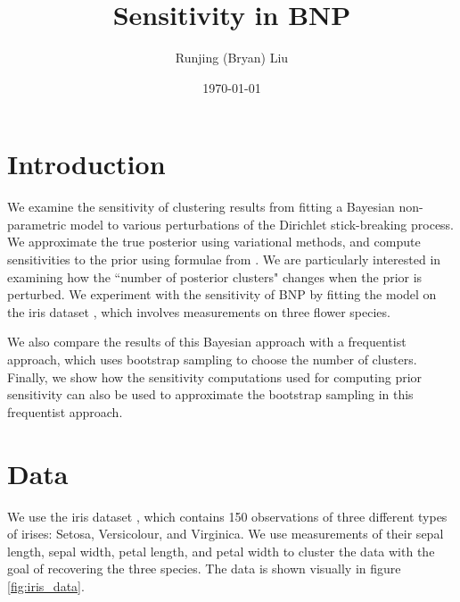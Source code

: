 \documentclass[a4paper]{article}
\title{Sensitivity in BNP}
\author{Runjing (Bryan) Liu}
\date{\today}
\begin{document}
\maketitle
\tableofcontents
\newpage
\section{Introduction}

We examine the sensitivity of clustering results from fitting a
Bayesian non-parametric model to various perturbations of
the Dirichlet stick-breaking process.
We approximate the true posterior using variational methods, and compute
sensitivities to the prior using formulae from \cite{giordano_2017}.
We are particularly interested in examining how the ``number of posterior
clusters" changes when the prior is perturbed. We experiment with the sensitivity
of BNP by fitting the model on the iris dataset
\cite{iris_dataset}, which
involves measurements on three flower species.

We also compare the results of this Bayesian approach with a frequentist approach,
which uses bootstrap sampling to choose the number of clusters. Finally, we
show how the sensitivity computations used for computing prior sensitivity can
also be used to approximate the bootstrap sampling in this frequentist approach.


\section{Data}
We use the iris dataset \cite{iris_dataset}, which contains 150 observations of
three different types
of irises: Setosa, Versicolour, and Virginica. We use measurements of their
sepal length, sepal width, petal length, and petal width to cluster the data with
the goal of recovering the three species. The data is shown visually in figure \ref{fig:iris_data}.
\end{document}
